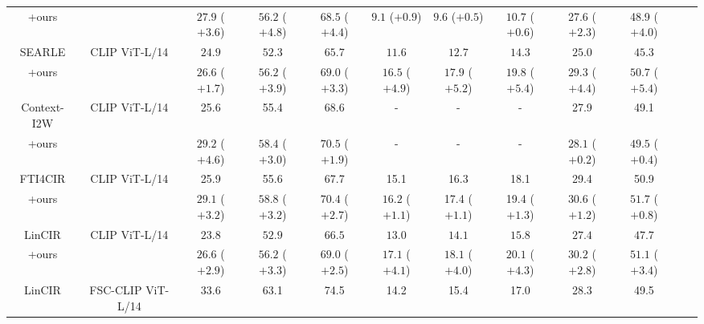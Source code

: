 \begin{table}[ht]
{\begin{tabular}{c|ccccccccccc}
     +ours  &   & $27.9$ \color{violet}($\mathbf{+3.6}$) & $56.2$ \color{violet}($\mathbf{+4.8}$) & $68.5$ \color{violet}($\mathbf{+4.4}$) & $9.1$ \color{violet}($\mathbf{+0.9}$) & $9.6$ \color{violet}($\mathbf{+0.5}$) & $10.7$ \color{violet}($\mathbf{+0.6}$) & 27.6 \color{violet}($\mathbf{+2.3}$) & 48.9 \color{violet}($\mathbf{+4.0}$) \\
    SEARLE \citep{searle} & CLIP ViT-L/14   & $24.9$ & $52.3$ & $65.7$ & $11.6$ & $12.7$ & $14.3$ & $25.0$ & $45.3$  \\
   \rowcolor{gray!20} +ours  & & $26.6$ \color{violet}($\mathbf{+1.7}$) & $56.2$ \color{violet}($\mathbf{+3.9}$) & $69.0$ \color{violet}($\mathbf{+3.3}$) & $16.5$ \color{violet}($\mathbf{+4.9}$) & $17.9$ \color{violet}($\mathbf{+5.2}$) & $19.8$ \color{violet}($\mathbf{+5.4}$) & $29.3$ \color{violet}($\mathbf{+4.4}$) & $50.7$ \color{violet}($\mathbf{+5.4}$) \\
    Context-I2W \citep{Context-I2W} & CLIP ViT-L/14  & 25.6 & 55.4 & 68.6 & - & - & - & 27.9 & 49.1  \\
    \rowcolor{gray!20} +ours  &   & $29.2$ \color{violet}($\mathbf{+4.6}$) & $58.4$ \color{violet}($\mathbf{+3.0}$) & $70.5$ \color{violet}($\mathbf{+1.9}$)& - & - & -& $28.1$ \color{violet}($\mathbf{+0.2}$)& $49.5$ \color{violet}($\mathbf{+0.4}$)  \\
    FTI4CIR \citep{FTI4CIR} & CLIP ViT-L/14  & 25.9 & 55.6 & 67.7 & 15.1 & 16.3 & 18.1 & 29.4 & 50.9  \\
   \rowcolor{gray!20} +ours  &   & $29.1$ \color{violet}($\mathbf{+3.2}$) & $58.8$ \color{violet}($\mathbf{+3.2}$)   & $70.4$ \color{violet}($\mathbf{+2.7}$) & $16.2$ \color{violet}($\mathbf{+1.1}$) & 17.4 \color{violet}($\mathbf{+1.1}$) & 19.4 \color{violet}($\mathbf{+1.3}$) & $30.6$ \color{violet}($\mathbf{+1.2}$) & $51.7$ \color{violet}($\mathbf{+0.8}$)  \\
    LinCIR \citep{lincir} & CLIP ViT-L/14 & $23.8$ & $52.9$ & $66.5$ & $13.0$ & $14.1$ & $15.8$  & $27.4$ & $47.7$  \\
    \rowcolor{gray!20} +ours  &  & $26.6$ \color{violet}($\mathbf{+2.9}$) & $56.2$ \color{violet}($\mathbf{+3.3}$) & $69.0$ \color{violet}($\mathbf{+2.5}$) & $17.1$ \color{violet}($\mathbf{+4.1}$) & $18.1$ \color{violet}($\mathbf{+4.0}$) & $20.1$ \color{violet}($\mathbf{+4.3}$)  & $30.2$ \color{violet}($\mathbf{+2.8}$) & $51.1$ \color{violet}($\mathbf{+3.4}$) \\
    LinCIR \citep{lincir} & FSC-CLIP \citep{fsc} ViT-L/14   & 33.6 & 63.1 & 74.5 & 14.2 & 15.4 & 17.0 & 28.3 & 49.5  \\

\end{tabular}}
\end{table}
